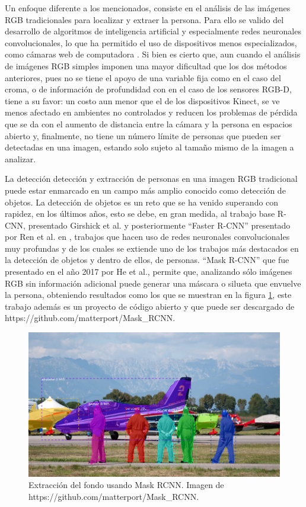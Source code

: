        Un enfoque diferente a los mencionados, consiste en el análisis de las imágenes RGB tradicionales para localizar y extraer la persona. Para ello se valido del desarrollo de algoritmos de inteligencia artificial y especialmente redes neuronales convolucionales, lo que ha permitido el uso de dispositivos menos especializados, como cámaras web de computadora \cite{Lie2018, Fan2017, Ravi2016}. Si bien es cierto que, aun cuando el análisis de imágenes RGB simples imponen una mayor dificultad que los dos métodos anteriores, pues no se tiene el apoyo de una variable fija como en el caso del croma, o de información de profundidad con en el caso de los sensores RGB-D, tiene a su favor: un costo aun menor que el de los dispositivos Kinect, se ve menos afectado en ambientes no controlados y reducen los problemas de pérdida que se da con el aumento de distancia entre la cámara y la persona en espacios abierto y, finalmente, no tiene un número límite de personas que pueden ser detectadas en una imagen, estando solo sujeto al tamaño mismo de la imagen a analizar. 
        
        La detección detección y extracción de personas en una imagen RGB tradicional puede estar enmarcado en un campo más amplio conocido como detección de objetos. La detección de objetos es un reto que se ha venido superando con rapidez, en los últimos años, esto se debe, en gran medida, al trabajo base R-CNN, presentado Girshick et al. \cite{Girshick2014} y posteriormente ``Faster R-CNN'' presentado por Ren et al. en \cite{Ren2015}, trabajos que hacen uso de redes neuronales convolucionales muy profundas y de los cuales se extiende uno de los trabajos más destacados en la detección de objetos y dentro de ellos, de personas. ``Mask R-CNN'' \cite{He2017} que fue presentado en el año 2017 por He et al., permite que, analizando sólo imágenes RGB sin información adicional puede generar una máscara o silueta que envuelve la persona, obteniendo resultados como los que se muestran en la figura \ref{fig:Mask-Rcnn}, este trabajo además es un proyecto de código abierto y que puede ser descargado de {https://github.com/matterport/Mask\_RCNN}.
        
        \begin{figure}[ht!]
        	\centering
        	\includegraphics[width=0.8\linewidth]{imgs/02-Referential/02-Mask-Rcnn.png}
        	\caption[Extracción del fondo usando Mask RCNN]{Extracción del fondo usando Mask RCNN. Imagen de {https://github.com/matterport/Mask\_RCNN}.}
    	    \label{fig:Mask-Rcnn}
        \end{figure}%
    
